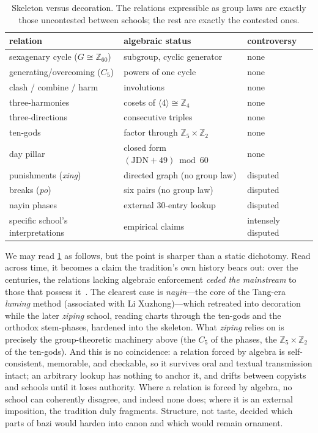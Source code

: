 \documentclass[11pt,a4paper]{article}
\theoremstyle{definition}
\theoremstyle{remark}
\newcommand{\Z}{\mathbb{Z}}
\begin{document}
\begin{table}[h]\centering
\caption{Skeleton versus decoration. The relations expressible as group laws are exactly those uncontested between schools; the rest are exactly the contested ones.\label{tab:skel}}
\small
\begin{tabular}{l l l}
\toprule
relation & algebraic status & controversy\\
\midrule
sexagenary cycle ($G\cong\Z_{60}$) & subgroup, cyclic generator & none\\
generating/overcoming ($C_5$) & powers of one cycle & none\\
clash / combine / harm & involutions & none\\
three-harmonies & cosets of $\langle4\rangle\cong\Z_4$ & none\\
three-directions & consecutive triples & none\\
ten-gods & factor through $\Z_5\times\Z_2$ & none\\
day pillar & closed form $(\mathrm{JDN}+49)\bmod60$ & none\\ \midrule
punishments (\emph{xing}) & directed graph (no group law) & disputed\\
breaks (\emph{po}) & six pairs (no group law) & disputed\\
nayin phases & external $30$-entry lookup & disputed\\
specific school's interpretations & empirical claims & intensely disputed\\
\bottomrule
\end{tabular}
\end{table}

We may read \cref{tab:skel} as follows, but the point is sharper than a static dichotomy. Read across time, it becomes a claim the tradition's own history bears out: over the centuries, the relations lacking algebraic enforcement \emph{ceded the mainstream} to those that possess it~\cite{smith1991,yuanhai,sanming}. The clearest case is \emph{nayin}---the core of the Tang-era \emph{luming} method (associated with Li Xuzhong)---which retreated into decoration while the later \emph{ziping} school, reading charts through the ten-gods and the orthodox stem-phases, hardened into the skeleton. What \emph{ziping} relies on is precisely the group-theoretic machinery above (the $C_5$ of the phases, the $\Z_5\times\Z_2$ of the ten-gods). And this is no coincidence: a relation forced by algebra is self-consistent, memorable, and checkable, so it survives oral and textual transmission intact; an arbitrary lookup has nothing to anchor it, and drifts between copyists and schools until it loses authority. Where a relation is forced by algebra, no school can coherently disagree, and indeed none does; where it is an external imposition, the tradition duly fragments. Structure, not taste, decided which parts of bazi would harden into canon and which would remain ornament.
\end{document}
